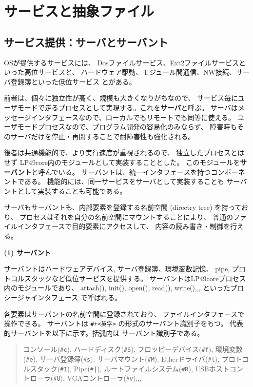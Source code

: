 \documentclass{ipsjpapers}
\begin{document}

\section{サービスと抽象ファイル}

\subsection{サービス提供：サーバとサーバント}

  OSが提供するサービスには、
  Dosファイルサービス、Ext2ファイルサービスといった高位サービスと、
  ハードウェア駆動、モジュール間通信、NW接続、サーバ登録簿といった低位サービス
  とがある。

  前者は、個々に独立性が高く、規模も大きくなりがちなので、
  サービス毎にユーザモードで走るプロセスとして実現する。これを{\bf サーバ}と呼ぶ。
  サーバはメッセージインタフェースなので、ローカルでもリモートでも同等に使える。
  ユーザモードプロセスなので、プログラム開発の容易化のみならず、
  障害時もそのサーバだけを停止・再開することで耐障害性も強化される。

  後者は共通機能的で、より実行速度が重視されるので、
  独立したプロセスとはせず LP49core内のモジュールとして実装することとした。
  このモジュールを{\bf サーバント}と呼んでいる。
  サーバントは、統一インタフェースを持つコンポーネントである。
  機能的には、同一サービスをサーバとして実装することも
  サーバントとして実装することも可能である。

   サーバもサーバントも、内部要素を登録する名前空間 (directry tree)
   を持っており、
   プロセスはそれを自分の名前空間にマウントすることにより、
   普通のファイルインタフェースで目的要素にアクセスして、
   内容の読み書き・制御を行える。

    
{\bf\flushleft (1) サーバント}

    サーバントはハードウェアデバイス, サーバ登録簿、環境変数記憶、
  pipe, プロトコルスタックなど低位サービスを提供する。
  サーバントはLP49coreプロセス内のモジュールであり、
  attach(), init(), open(), read(), write(),,, といったプロシージャインタフェース
  で呼ばれる。

  各要素はサーバントの名前空間に登録されており、
  ファイルインタフェースで操作できる。
  サーバントは \verb|#+<英字>| の形式のサーバント識別子をもつ。
  代表的サーバントを以下に示す。括弧内は サーバント識別子である。

{\small
\begin{quote}
     コンソール(\verb|#c|), ハードディスク(\verb|#S|), フロッピーデバイス(\verb|#f|), 
     環境変数 (\verb|#e|), サーバ登録簿(\verb|#s|), サーバマウント(\verb|#M|), 
     Etherドライバ(\verb|#l|), 
     プロトコルスタック(\verb|#I|), Pipe(\verb$#|$), ルートファイルシステム(\verb|#R|), 
     USBホストコントローラ(\verb|#U|), VGAコントローラ(\verb|#v|),,,
\end{quote}
}
\end{document}
